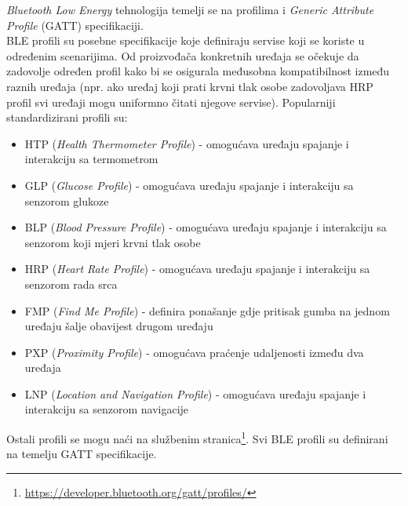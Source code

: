 \textit{Bluetooth Low Energy} tehnologija temelji se na profilima i \textit{Generic Attribute Profile} (GATT) specifikaciji. 
\\
BLE profili su posebne specifikacije koje definiraju servise koji se koriste u određenim scenarijima. 
Od proizvođača konkretnih uređaja se očekuje da zadovolje određen profil kako bi se osigurala međusobna kompatibilnost između raznih uređaja (npr. ako uređaj koji prati krvni tlak osobe zadovoljava HRP profil svi uređaji mogu uniformno čitati njegove servise). 
Popularniji standardizirani profili su:
\begin{itemize}
    \item HTP (\textit{Health Thermometer Profile}) - omogućava uređaju spajanje i interakciju sa termometrom
    \item GLP (\textit{Glucose Profile}) - omogućava uređaju spajanje i interakciju sa senzorom glukoze
    \item BLP (\textit{Blood Pressure Profile}) - omogućava uređaju spajanje i interakciju sa senzorom koji mjeri krvni tlak osobe 
    \item HRP (\textit{Heart Rate Profile}) - omogućava uređaju spajanje i interakciju sa senzorom rada srca 
    \item FMP (\textit{Find Me Profile}) - definira ponašanje gdje pritisak gumba na jednom uređaju šalje obavijest drugom uređaju
    \item PXP (\textit{Proximity Profile}) - omogućava praćenje udaljenosti između dva uređaja
    \item LNP (\textit{Location and Navigation Profile}) - omogućava uređaju spajanje i interakciju sa senzorom navigacije
\end{itemize}
Ostali profili se mogu naći na službenim stranica\footnote{\url{https://developer.bluetooth.org/gatt/profiles/}}. Svi BLE profili su definirani na temelju GATT specifikacije.
\\

